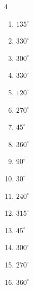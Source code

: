 \begin{multicols}{4}
\begin{enumerate}
  \item $\displaystyle 135^{\circ}$

  \item $\displaystyle 330^{\circ}$

  \item $\displaystyle 300^{\circ}$

  \item $\displaystyle 330^{\circ}$

  \item $\displaystyle 120^{\circ}$

\columnbreak %

  \item $\displaystyle 270^{\circ}$

  \item $\displaystyle 45^{\circ}$

  \item $\displaystyle 360^{\circ}$
        \phantom{$\displaystyle =2\pi$}

  \item $\displaystyle 90^{\circ}$

  \item $\displaystyle 30^{\circ}$

  \item $\displaystyle 240^{\circ}$

  \item $\displaystyle 315^{\circ}$

  \item $\displaystyle 45^{\circ}$

  \item $\displaystyle 300^{\circ}$

  \item $\displaystyle 270^{\circ}$

  \item $\displaystyle 360^{\circ}$
        \phantom{$\displaystyle =2\pi$}


\end{enumerate}
\end{multicols}
